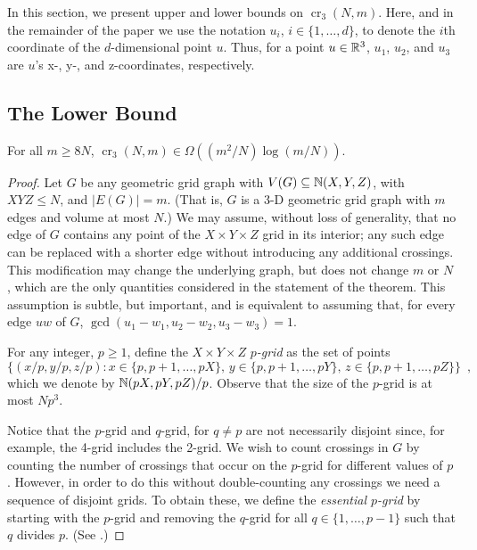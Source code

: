 \documentclass[12pt]{article}
\newcommand{\n}{N}
\DeclareMathOperator{\crs}{cr}
\begin{document}
In this section, we present upper and lower bounds on $\crs_3(\n,m)$.
Here, and in the remainder of the paper we use the notation
$u_i$, $i\in\{1,\ldots,d\}$, to denote the $i$th coordinate of the
$d$-dimensional point $u$.  Thus, for a point $u\in\mathbb{R}^3$, $u_1$, $u_2$,
and $u_3$ are $u$'s x-, y-, and z-coordinates, respectively.

\subsection{The Lower Bound}


\begin{thm}
  For all $m\ge 8\n$, $\crs_3(\n,m) \in \Omega((m^2/\n)\log(m/\n))$.
\end{thm}

\begin{proof}
  Let $G$ be any geometric grid graph with $V(G)\subseteq\mathbb{N}(X,Y,Z)$,
  with $XYZ\le\n$, and $|E(G)|=m$. (That is, $G$ is a 3-D geometric
  grid graph with $m$ edges and volume at most $\n$.)  We may assume,
  without loss of generality, that no edge of $G$ contains any point
  of the $X\times Y\times Z$ grid in its interior; any such edge can
  be replaced with a shorter edge without introducing any additional
  crossings.  This modification may change the underlying graph, but
  does not change $m$ or $\n$, which are the only quantities considered
  in the statement of the theorem. This assumption is subtle,
  but important, and is equivalent to assuming that, for every edge $uw$
  of $G$, $\gcd(u_1-w_1, u_2-w_2, u_3-w_3)=1$.

  For any integer, $p\ge 1$, define the $X\times Y\times Z$
  \emph{$p$-grid} as the set of points
  \[
    \{(x/p,y/p,z/p): x\in\{p,p+1,\ldots,pX\},\,
    y\in\{p,p+1,\ldots,pY\},\, z\in\{p,p+1,\ldots,pZ\}\} \enspace ,
  \]
  which we denote by $\mathbb{N}(pX,pY,pZ)/p$.  Observe that the size of the
  $p$-grid is at most $\n p^3$.

  Notice that the $p$-grid and $q$-grid, for $q\neq p$ are not necessarily
  disjoint since, for example, the 4-grid includes the 2-grid.  We wish
  to count crossings in $G$ by counting the number of crossings that
  occur on the $p$-grid for different values of $p$.  However, in order
  to do this without double-counting any crossings we need a sequence
  of disjoint grids. To obtain these, we define
  the \emph{essential $p$-grid} by starting with the $p$-grid and removing
  the $q$-grid for all $q\in\{1,\ldots,p-1\}$ such that $q$ divides $p$.
  (See .)
  

\end{proof}
\end{document}
